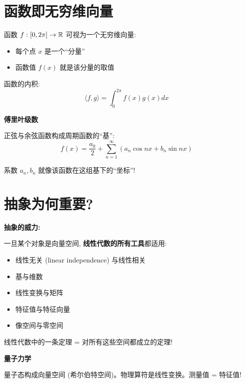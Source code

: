 \section{函数即无穷维向量}

\begin{intuition}
函数 $f: [0, 2\pi] \to \mathbb{R}$ 可视为一个无穷维向量:
\begin{itemize}
    \item 每个点 $x$ 是一个``分量''
    \item 函数值 $f(x)$ 就是该分量的取值
\end{itemize}

函数的内积:
\[
\langle f, g \rangle = \int_0^{2\pi} f(x) g(x) dx
\]
\end{intuition}

\begin{practical}
\textbf{傅里叶级数}

正弦与余弦函数构成周期函数的``基'':
\[
f(x) = \frac{a_0}{2} + \sum_{n=1}^{\infty} (a_n \cos nx + b_n \sin nx)
\]

系数 $a_n, b_n$ 就像该函数在这组基下的``坐标''!
\end{practical}

\section{抽象为何重要?}

\begin{summary}
\textbf{抽象的威力:}

一旦某个对象是向量空间, \textbf{线性代数的所有工具}都适用:
\begin{itemize}
    \item 线性无关 (linear independence) 与线性相关
    \item 基与维数
    \item 线性变换与矩阵
    \item 特征值与特征向量
    \item 像空间与零空间
\end{itemize}

线性代数中的一条定理 = 对所有这些空间都成立的定理!
\end{summary}

\begin{practical}
\textbf{量子力学}

量子态构成向量空间 (希尔伯特空间)。物理算符是线性变换。测量值 = 特征值!
\end{practical}

